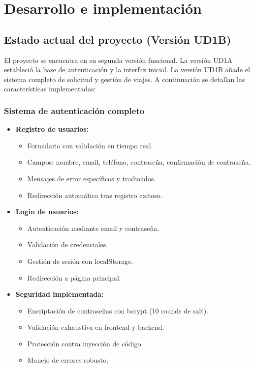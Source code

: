\documentclass[12pt,a4paper]{article}
\begin{document}
\newpage

\section{Desarrollo e implementación}

\subsection{Estado actual del proyecto (Versión UD1B)}

El proyecto se encuentra en su segunda versión funcional. La versión UD1A estableció la base de autenticación y la interfaz inicial. La versión UD1B añade el sistema completo de solicitud y gestión de viajes. A continuación se detallan las características implementadas:

\subsubsection{Sistema de autenticación completo}

\begin{itemize}
    \item \textbf{Registro de usuarios:}
    \begin{itemize}
        \item Formulario con validación en tiempo real.
        \item Campos: nombre, email, teléfono, contraseña, confirmación de contraseña.
        \item Mensajes de error específicos y traducidos.
        \item Redirección automática tras registro exitoso.
    \end{itemize}
    
    \item \textbf{Login de usuarios:}
    \begin{itemize}
        \item Autenticación mediante email y contraseña.
        \item Validación de credenciales.
        \item Gestión de sesión con localStorage.
        \item Redirección a página principal.
    \end{itemize}
    
    \item \textbf{Seguridad implementada:}
    \begin{itemize}
        \item Encriptación de contraseñas con bcrypt (10 rounds de salt).
        \item Validación exhaustiva en frontend y backend.
        \item Protección contra inyección de código.
        \item Manejo de errores robusto.
    \end{itemize}
\end{itemize}
\end{document}
